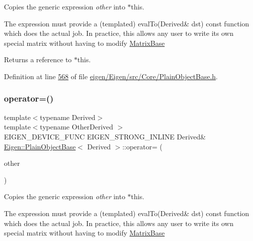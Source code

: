 Copies the generic expression {\itshape other} into $\ast$this. 

The expression must provide a (templated) eval\+To(\+Derived\& dst) const function which does the actual job. In practice, this allows any user to write its own special matrix without having to modify \hyperlink{group___core___module_class_eigen_1_1_matrix_base}{Matrix\+Base}

\begin{DoxyReturn}{Returns}
a reference to $\ast$this. 
\end{DoxyReturn}


Definition at line \hyperlink{eigen_2_eigen_2src_2_core_2_plain_object_base_8h_source_l00568}{568} of file \hyperlink{eigen_2_eigen_2src_2_core_2_plain_object_base_8h_source}{eigen/\+Eigen/src/\+Core/\+Plain\+Object\+Base.\+h}.

\mbox{\label{class_eigen_1_1_plain_object_base_a6d280056e43429f043e8b25262ee6153}} 
\subsubsection{\texorpdfstring{operator=()}{operator=()}\hspace{0.1cm}{\footnotesize\ttfamily [4/4]}}
{\footnotesize\ttfamily template$<$typename Derived$>$ \\
template$<$typename Other\+Derived $>$ \\
E\+I\+G\+E\+N\+\_\+\+D\+E\+V\+I\+C\+E\+\_\+\+F\+U\+NC E\+I\+G\+E\+N\+\_\+\+S\+T\+R\+O\+N\+G\+\_\+\+I\+N\+L\+I\+NE Derived\& \hyperlink{class_eigen_1_1_plain_object_base}{Eigen\+::\+Plain\+Object\+Base}$<$ Derived $>$\+::operator= (\begin{DoxyParamCaption}\item[{const \hyperlink{group___core___module_struct_eigen_1_1_eigen_base}{Eigen\+Base}$<$ Other\+Derived $>$ \&}]{other }\end{DoxyParamCaption})\hspace{0.3cm}{\ttfamily [inline]}}



Copies the generic expression {\itshape other} into $\ast$this. 

The expression must provide a (templated) eval\+To(\+Derived\& dst) const function which does the actual job. In practice, this allows any user to write its own special matrix without having to modify \hyperlink{group___core___module_class_eigen_1_1_matrix_base}{Matrix\+Base}

